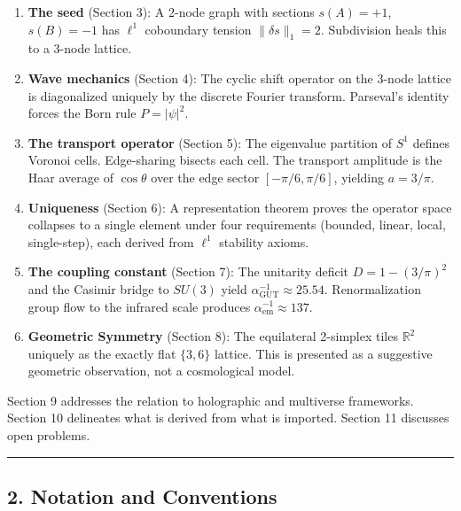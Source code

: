 \documentclass[
]{article}
\begin{document}
\begin{enumerate}
\def\labelenumi{\arabic{enumi}.}
\item
  \textbf{The seed} (Section 3): A 2-node graph with sections
  \(s(A) = +1\), \(s(B) = -1\) has \(\ell^1\) coboundary tension
  \(\|\delta s\|_1 = 2\). Subdivision heals this to a 3-node lattice.
\item
  \textbf{Wave mechanics} (Section 4): The cyclic shift operator on the
  3-node lattice is diagonalized uniquely by the discrete Fourier
  transform. Parseval's identity forces the Born rule \(P = |\psi|^2\).
\item
  \textbf{The transport operator} (Section 5): The eigenvalue partition
  of \(S^1\) defines Voronoi cells. Edge-sharing bisects each cell. The
  transport amplitude is the Haar average of \(\cos\theta\) over the
  edge sector \([-\pi/6, \pi/6]\), yielding \(a = 3/\pi\).
\item
  \textbf{Uniqueness} (Section 6): A representation theorem proves the
  operator space collapses to a single element under four requirements
  (bounded, linear, local, single-step), each derived from \(\ell^1\)
  stability axioms.
\item
  \textbf{The coupling constant} (Section 7): The unitarity deficit
  \(D = 1 - (3/\pi)^2\) and the Casimir bridge to \(SU(3)\) yield
  \(\alpha_{\mathrm{GUT}}^{-1} \approx 25.54\). Renormalization group
  flow to the infrared scale produces
  \(\alpha_{\mathrm{em}}^{-1} \approx 137\).
\item
  \textbf{Geometric Symmetry} (Section 8): The equilateral 2-simplex
  tiles \(\mathbb{R}^2\) uniquely as the exactly flat \(\{3,6\}\)
  lattice. This is presented as a suggestive geometric observation, not
  a cosmological model.
\end{enumerate}

Section 9 addresses the relation to holographic and multiverse
frameworks. Section 10 delineates what is derived from what is imported.
Section 11 discusses open problems.

\begin{center}\rule{0.5\linewidth}{0.5pt}\end{center}

\hypertarget{notation-and-conventions}{%
\subsection{2. Notation and
Conventions}\label{notation-and-conventions}}
\end{document}
